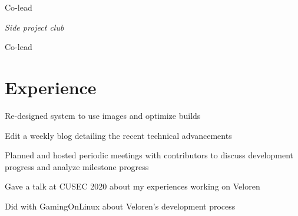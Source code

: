 \documentclass[]{deedy-resume-openfont}
\begin{document}
\begin{minipage}[t]{0.33\textwidth}
\begin{tightemize}
\item Co-lead

\end{tightemize}
\textit{Side project club}
\begin{tightemize}

\item Co-lead

\end{tightemize}

%
%

\end{minipage} 
\hfill
\begin{minipage}[t]{0.66\textwidth}


\section{Experience}

\begin{tightemize}

\item Re-designed system to use images and optimize builds

\item Edit a weekly blog detailing the recent technical advancements

\item Planned and hosted periodic meetings with contributors to discuss development progress and analyze milestone progress

\item Gave a talk \href{https://www.youtube.com/watch?v=aS26sqT09Pw}{}at CUSEC 2020 about my experiences working on Veloren

\item Did \href{https://www.gamingonlinux.com/2020/06/interviewed-veloren-an-upcoming-foss-multiplayer-voxel-rpg}{}with GamingOnLinux about Veloren's development process

\end{tightemize}
\sectionsep
{}
\begin{tightemize}


\end{tightemize}
\end{minipage}
\end{document}
